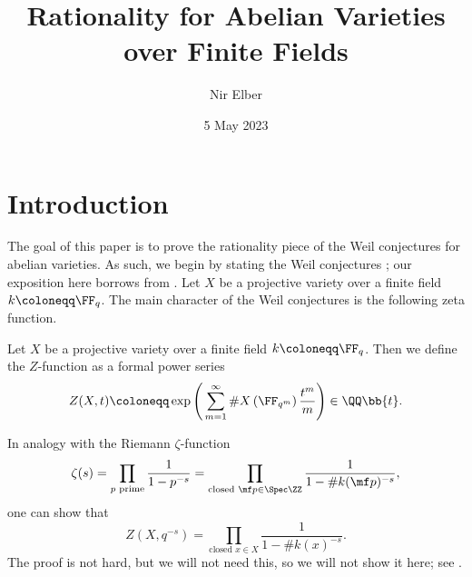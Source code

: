 \documentclass{amsart}
\title{Rationality for Abelian Varieties over Finite Fields}
\author{Nir Elber}
\date{5 May 2023}
\begin{document}

\maketitle

\setcounter{tocdepth}{2}
\tableofcontents

\section{Introduction}
The goal of this paper is to prove the rationality piece of the Weil conjectures for abelian varieties. As such, we begin by stating the Weil conjectures \cite{weil-conj}; our exposition here borrows from \cite{raskin-weil-conj}. Let $X$ be a projective variety over a finite field $k\coloneqq\FF_q$. The main character of the Weil conjectures is the following zeta function.
\begin{definition}[$Z$-function]
	Let $X$ be a projective variety over a finite field $k\coloneqq\FF_q$. Then we define the $Z$-function as a formal power series
	\begin{equation}
		Z(X,t)\coloneqq\exp\Bigg(\sum_{m=1}^\infty\#X\left(\FF_{q^m}\right)\frac{t^m}m\Bigg)\in\QQ\bb{t}. \label{eq:zeta-via-exp}
	\end{equation}
\end{definition}
\begin{remark}
	In analogy with the Riemann $\zeta$-function
	\[\zeta(s)=\prod_{p\text{ prime}}\frac1{1-p^{-s}}=\prod_{\text{closed }\mf p\in\Spec\ZZ}\frac1{1-\#k(\mf p)^{-s}},\]
	one can show that
	\[Z\left(X,q^{-s}\right)=\prod_{\text{closed }x\in X}\frac1{1-\#k(x)^{-s}}.\]
	The proof is not hard, but we will not need this, so we will not show it here; see \cite[Proposition~1.5]{raskin-weil-conj}.
\end{remark}
\end{document}
